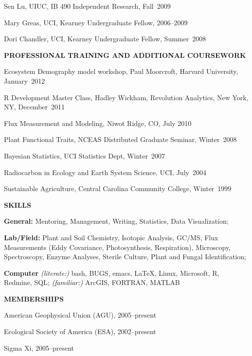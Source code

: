 \documentclass[10pt,twoside]{article}
\begin{document}
\begin{itemize*}
\renewcommand{\labelenumi}{U\arabic{enumi}.} %
\item Sen Lu, UIUC, IB 490 Independent Research, Fall~2009 
\item Mary Greas, UCI, Kearney Undergraduate Fellow, 2006--2009  %
\item Dori Chandler, UCI, Kearney Undergraduate Fellow, Summer~2008
\end{itemize*}

\textbf{PROFESSIONAL TRAINING AND ADDITIONAL COURSEWORK}
\begin{itemize*}
\item Ecosystem Demography model workshop, Paul Moorcroft, Harvard University, January~2012 
\item R Development Master Class, Hadley Wickham, Revolution Analytics, New York, NY, December~2011
\item Flux Measurement and Modeling, Niwot Ridge, CO, July 2010  
\item Plant Functional Traits, NCEAS Distributed Graduate Seminar, Winter~2008
\item Bayesian Statistics, UCI Statistics Dept, Winter~2007
\item Radiocarbon in Ecology and Earth System Science, UCI, July~2004
\item Sustainable Agriculture, Central Carolina Community College, Winter~1999 
\end{itemize*}

\textbf{SKILLS}
\vspace{0.5em}

\begin{itemize*}
\item{\textbf{General:}}  Mentoring, Management, Writing, Statistics, Data Visualization;
\item{\textbf{Lab/Field:}}  Plant and Soil Chemistry, Isotopic Analysis, GC/MS, Flux Measurements (Eddy Covariance, Photosynthesis, Respiration), Microscopy, Spectroscopy, Enzyme Analyses, Sterile Culture, Plant and Fungal Identification;
\item{\textbf{Computer}} \textit{(literate:)} bash, BUGS, emacs, \LaTeX, Linux, Microsoft, R, Redmine, SQL; \textit{(familiar:)} ArcGIS, FORTRAN, MATLAB 
\end{itemize*}

\textbf{MEMBERSHIPS}
\begin{itemize*}
\item American Geophysical Union (AGU), 2005--present
\item Ecological Society of America (ESA), 2002--present
\item Sigma Xi, 2005--present
\end{itemize*}
\end{document}
